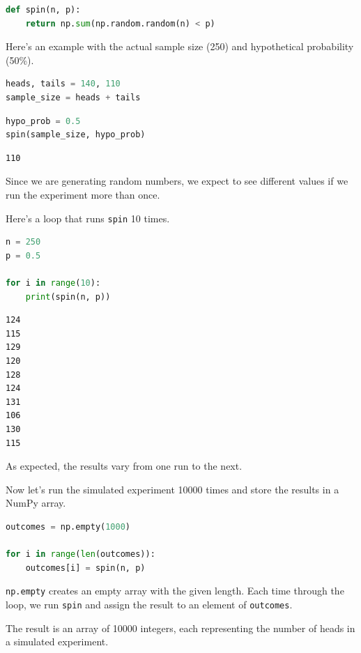 \begin{lstlisting}[language=Python,style=source]
def spin(n, p):
    return np.sum(np.random.random(n) < p)
\end{lstlisting}

Here's an example with the actual sample size (250) and hypothetical
probability (50\%).

\begin{lstlisting}[language=Python,style=source]
heads, tails = 140, 110
sample_size = heads + tails
\end{lstlisting}

\begin{lstlisting}[language=Python,style=source]
hypo_prob = 0.5
spin(sample_size, hypo_prob)
\end{lstlisting}

\begin{lstlisting}[style=output]
110
\end{lstlisting}

Since we are generating random numbers, we expect to see different
values if we run the experiment more than once.

Here's a loop that runs \passthrough{\lstinline!spin!} 10 times.

\begin{lstlisting}[language=Python,style=source]
n = 250
p = 0.5

for i in range(10):
    print(spin(n, p))
\end{lstlisting}

\begin{lstlisting}[style=output]
124
115
129
120
128
124
131
106
130
115
\end{lstlisting}

As expected, the results vary from one run to the next.

Now let's run the simulated experiment 10000 times and store the results
in a NumPy array.

\begin{lstlisting}[language=Python,style=source]
outcomes = np.empty(1000)

for i in range(len(outcomes)):
    outcomes[i] = spin(n, p)
\end{lstlisting}

\passthrough{\lstinline!np.empty!} creates an empty array with the given
length. Each time through the loop, we run
\passthrough{\lstinline!spin!} and assign the result to an element of
\passthrough{\lstinline!outcomes!}.

The result is an array of 10000 integers, each representing the number
of heads in a simulated experiment.

